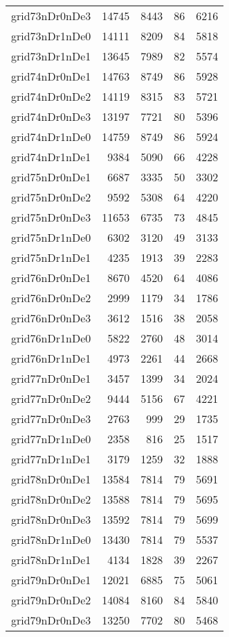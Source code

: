\documentclass[../../../thesis.tex]{subfiles}
\begin{document}
\begin{longtable}{lrrrr}
grid73nDr0nDe3 & 14745 & 8443 & 86 & 6216 \\
grid73nDr1nDe0 & 14111 & 8209 & 84 & 5818 \\
grid73nDr1nDe1 & 13645 & 7989 & 82 & 5574 \\
grid74nDr0nDe1 & 14763 & 8749 & 86 & 5928 \\
grid74nDr0nDe2 & 14119 & 8315 & 83 & 5721 \\
grid74nDr0nDe3 & 13197 & 7721 & 80 & 5396 \\
grid74nDr1nDe0 & 14759 & 8749 & 86 & 5924 \\
grid74nDr1nDe1 & 9384 & 5090 & 66 & 4228 \\
grid75nDr0nDe1 & 6687 & 3335 & 50 & 3302 \\
grid75nDr0nDe2 & 9592 & 5308 & 64 & 4220 \\
grid75nDr0nDe3 & 11653 & 6735 & 73 & 4845 \\
grid75nDr1nDe0 & 6302 & 3120 & 49 & 3133 \\
grid75nDr1nDe1 & 4235 & 1913 & 39 & 2283 \\
grid76nDr0nDe1 & 8670 & 4520 & 64 & 4086 \\
grid76nDr0nDe2 & 2999 & 1179 & 34 & 1786 \\
grid76nDr0nDe3 & 3612 & 1516 & 38 & 2058 \\
grid76nDr1nDe0 & 5822 & 2760 & 48 & 3014 \\
grid76nDr1nDe1 & 4973 & 2261 & 44 & 2668 \\
grid77nDr0nDe1 & 3457 & 1399 & 34 & 2024 \\
grid77nDr0nDe2 & 9444 & 5156 & 67 & 4221 \\
grid77nDr0nDe3 & 2763 & 999 & 29 & 1735 \\
grid77nDr1nDe0 & 2358 & 816 & 25 & 1517 \\
grid77nDr1nDe1 & 3179 & 1259 & 32 & 1888 \\
grid78nDr0nDe1 & 13584 & 7814 & 79 & 5691 \\
grid78nDr0nDe2 & 13588 & 7814 & 79 & 5695 \\
grid78nDr0nDe3 & 13592 & 7814 & 79 & 5699 \\
grid78nDr1nDe0 & 13430 & 7814 & 79 & 5537 \\
grid78nDr1nDe1 & 4134 & 1828 & 39 & 2267 \\
grid79nDr0nDe1 & 12021 & 6885 & 75 & 5061 \\
grid79nDr0nDe2 & 14084 & 8160 & 84 & 5840 \\
grid79nDr0nDe3 & 13250 & 7702 & 80 & 5468 \\

\end{longtable}
\end{document}
